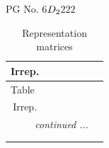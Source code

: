\documentclass[fleqn,8pt,landscape]{jsarticle}
\begin{document}
\setcounter{MaxMatrixCols}{32}

\renewcommand{\tablename}{Table~}
\renewcommand{\figurename}{Figure~}
\begin{center}
\LARGE
PG No. 6\quad$D_{\rm 2}$\quad$222$\quad[ orthorhombic ]
\end{center}
\renewcommand{\arraystretch}{1.2}
\begin{longtable}{ccccccc}
\caption{Representation matrices}
 \\
 \hline \hline
Irrep. &  &  &  &  &  &  \\ \hline \endfirsthead

\multicolumn{6}{l}{\tablename\ \thetable{}} \\
 \hline \hline
Irrep. &  &  &  &  &  &  \\ \hline \endhead

 \hline \hline
\multicolumn{6}{r}{\footnotesize\it continued ...} \\ \endfoot

 \hline \hline
\multicolumn{6}{r}{} \\ \endlastfoot


\end{longtable}
\end{document}
